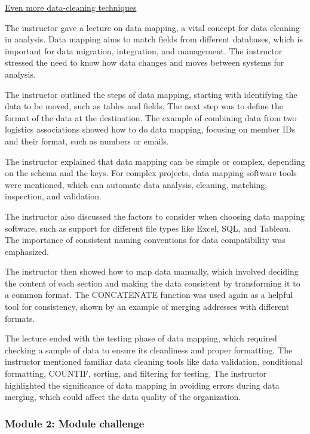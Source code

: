 \documentclass[]{article}
\begin{document}
\uline{Even more data-cleaning techniques}

The instructor gave a lecture on data mapping, a vital concept for data cleaning in analysis. Data mapping aims to match fields from different databases, which is important for data migration, integration, and management. The instructor stressed the need to know how data changes and moves between systems for analysis.

The instructor outlined the steps of data mapping, starting with identifying the data to be moved, such as tables and fields. The next step was to define the format of the data at the destination. The example of combining data from two logistics associations showed how to do data mapping, focusing on member IDs and their format, such as numbers or emails.

The instructor explained that data mapping can be simple or complex, depending on the schema and the keys. For complex projects, data mapping software tools were mentioned, which can automate data analysis, cleaning, matching, inspection, and validation.

The instructor also discussed the factors to consider when choosing data mapping software, such as support for different file types like Excel, SQL, and Tableau. The importance of consistent naming conventions for data compatibility was emphasized.

The instructor then showed how to map data manually, which involved deciding the content of each section and making the data consistent by transforming it to a common format. The CONCATENATE function was used again as a helpful tool for consistency, shown by an example of merging addresses with different formats.

The lecture ended with the testing phase of data mapping, which required checking a sample of data to ensure its cleanliness and proper formatting. The instructor mentioned familiar data cleaning tools like data validation, conditional formatting, COUNTIF, sorting, and filtering for testing. The instructor highlighted the significance of data mapping in avoiding errors during data merging, which could affect the data quality of the organization.

\subsubsection{Module 2: Module challenge}
\end{document}
